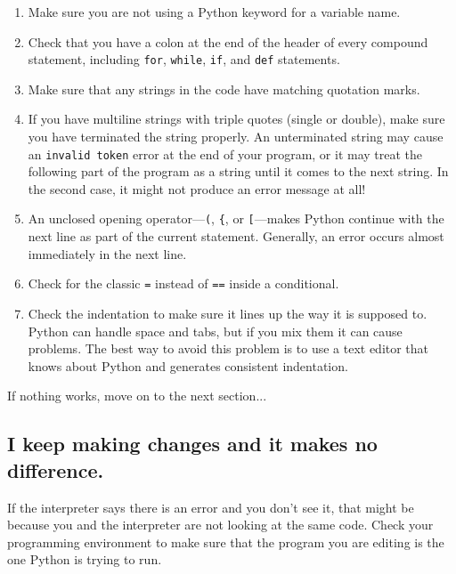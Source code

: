 \documentclass[10pt]{book}
\begin{document}
\begin{enumerate}

\item Make sure you are not using a Python keyword for a variable name.

\item Check that you have a colon at the end of the header of every
compound statement, including {\tt for}, {\tt while},
{\tt if}, and {\tt def} statements.

\item Make sure that any strings in the code have matching
quotation marks.

\item If you have multiline strings with triple quotes (single or double), make
sure you have terminated the string properly.  An unterminated string
may cause an {\tt invalid token} error at the end of your program,
or it may treat the following part of the program as a string until it
comes to the next string.  In the second case, it might not produce an error
message at all!

\item An unclosed opening operator---\verb+(+, \verb+{+, or
  \verb+[+---makes Python continue with the next line as part of the
  current statement.  Generally, an error occurs almost immediately in
  the next line.

\item Check for the classic {\tt =} instead of {\tt ==} inside
a conditional.

\item Check the indentation to make sure it lines up the way it
is supposed to.  Python can handle space and tabs, but if you mix
them it can cause problems.  The best way to avoid this problem
is to use a text editor that knows about Python and generates
consistent indentation.

\end{enumerate}

If nothing works, move on to the next section...


\subsection{I keep making changes and it makes no difference.}

If the interpreter says there is an error and you don't see it, that
might be because you and the interpreter are not looking at the same
code.  Check your programming environment to make sure that the
program you are editing is the one Python is trying to run.
\end{document}
